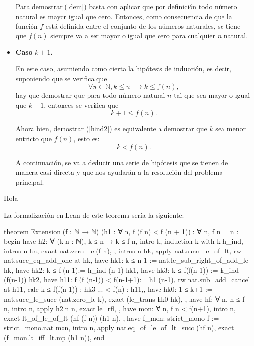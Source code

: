 \begin{demostracion}
\begin{itemize}
      Para demostrar (\ref{dem}) basta con aplicar que por
      definición todo número natural es mayor igual que cero.
      Entonces, como consecuencia de que la función \(f\) está
      definida entre el conjunto de los números naturales, se tiene
      que \(f(n)\) siempre va a ser mayor o igual que cero para
      cualquier \(n\) natural.
      
    \item \textbf{Caso \(k+1\).}
    
      En este caso, asumiendo como cierta la hipótesis de inducción,
      es decir, suponiendo que se verifica que
      \begin{equation}\label{hind}\tag{h\(\_\)ind}
        ∀ n ∈ ℕ, k≤ n ⟶ k ≤ f(n),
      \end{equation}
      hay que demostrar que para todo número natural \(n\) tal que
      sea mayor o igual que \(k+1\), entonces se verifica que
      \begin{equation}\label{hind2}
        k+1 ≤ f(n).
      \end{equation}

      Ahora bien, demostrar (\ref{hind2}) es equivalente a demostrar
      que \(k\) sea menor entricto que \(f(n)\), esto es:
      \begin{equation}
        k<f(n).
      \end{equation}

      A continuación, se va a deducir una serie de hipótesis que se
      tienen de manera casi directa y que nos ayudarán a la
      resolución del problema principal.
    \end{itemize}
    Hola
\end{demostracion}

La formalización en Lean de este teorema sería la siguiente:
\begin{leancode}
theorem Extension
  (f : ℕ → ℕ)
  (h1 : ∀ n, f (f n) < f (n + 1))
  : ∀ n, f n = n :=
begin
  have h2: ∀ (k n : ℕ), k ≤ n → k ≤ f n,
  { intro k,
     induction k with k h_ind,
     { intros n hn,
       exact nat.zero_le (f n), },
     { intros n hk,
       apply nat.succ_le_of_lt,
       rw nat.succ_eq_add_one at hk,
       have hk1: k ≤ n-1 := nat.le_sub_right_of_add_le hk,
       have hk2: k ≤ f (n-1):= h_ind (n-1) hk1,
       have hk3: k ≤ f(f(n-1)) := h_ind (f(n-1)) hk2,
       have h11: f (f (n-1)) < f(n-1+1):= h1 (n-1),
       rw nat.sub_add_cancel at h11,
       { calc k ≤ f(f(n-1)) : hk3
            ... < f(n)      : h11,},
       have hk0: 1 ≤ k+1 := nat.succ_le_succ (nat.zero_le k),
       exact (le_trans hk0 hk), }},
  have hf: ∀ n, n ≤ f n,
    { intro n,
      apply h2 n n,
      exact le_rfl, },
  have mon: ∀ n, f n < f(n+1),
    { intro n,
      exact lt_of_le_of_lt (hf (f n)) (h1 n), },
  have f_mon: strict_mono f := strict_mono.nat mon,
  intro n,
  apply nat.eq_of_le_of_lt_succ (hf n),
  exact (f_mon.lt_iff_lt.mp (h1 n)),
end
\end{leancode}

